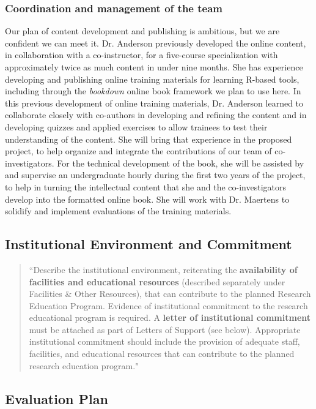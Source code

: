 \documentclass[pdftex,english,11pt,parskip=half]{scrartcl}
\begin{document}
\subsubsection{Coordination and management of the team}

Our plan of content development and publishing is ambitious, but we are confident we can meet it. Dr. Anderson previously developed the online content, in collaboration with a co-instructor, for a five-course specialization with approximately twice as much content in under nine months. She has experience developing and publishing online training materials for learning R-based tools, including through the \textit{bookdown} online book framework we plan to use here. In this previous development of online training materials, Dr. Anderson learned to collaborate closely with co-authors in developing and refining the content and in developing quizzes and applied exercises to allow trainees to test their understanding of the content. She will bring that experience in the proposed project, to help organize and integrate the contributions of our team of co-investigators. For the technical development of the book, she will be assisted by and supervise an undergraduate hourly during the first two years of the project, to help in turning the intellectual content that she and the co-investigators develop into the formatted online book. She will work with Dr. Maertens to solidify and implement evaluations of the training materials.

\subsection{Institutional Environment and Commitment}

\begin{quotation}
``Describe the institutional environment, reiterating the \textbf{availability of facilities and educational resources} (described separately under Facilities \& Other Resources), that can contribute to the planned Research Education Program. Evidence of institutional commitment to the research educational program is required. A \textbf{letter of institutional commitment} must be attached as part of Letters of Support (see below). Appropriate institutional commitment should include the provision of adequate staff, facilities, and educational resources that can contribute to the planned research education program."
\end{quotation}

\subsection{Evaluation Plan}
\end{document}
